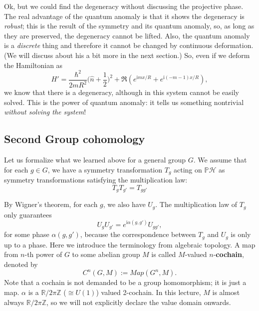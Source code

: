 \documentclass[
]{scrartcl}
\numberwithin{equation}{section}
\theoremstyle{definition}
\theoremstyle{definition}
\theoremstyle{definition}
\theoremstyle{definition}
\theoremstyle{remark}
\begin{document}
Ok, but we could find the degeneracy without discussing the projective phase. The real advantage of the quantum anomaly is that it shows the degeneracy is \emph{robust}; this is the result of the symmetry and its quantum anomaly, so, as long as they are preserved, the degeneracy cannot be lifted.
Also, the quantum anomaly is a \emph{discrete} thing and therefore it cannot be changed by continuous deformation. (We will discuss about his a bit more in the next section.)
So, even if we deform the Hamiltonian as
\begin{equation}
  \label{eq:ABringHamDef}
  H' = \frac{\hbar^2}{2mR^2}\bigl(\hat{n} + \frac{1}{2} \bigr)^2 + \Re(e^{\mathrm{i}m x/R}+e^{\mathrm{i}(-m-1)x/R}),
\end{equation}
we know that there is a degeneracy, although in this system cannot be easily solved.
This is the power of quantum anomaly: it tells us something nontrivial \emph{without solving the system}!

\hypertarget{second-group-cohomology}{%
\subsection{Second Group cohomology}\label{second-group-cohomology}}

Let us formalize what we learned above for a general group \(G\).
We assume that for each \(g\in G\), we have a symmetry transformation \(T_g\) acting on \(\mathbb{P}\mathcal{H}\) as symmetry transformations satisfying the multiplication law:
\begin{equation}
  \label{eq:Tmult}
  T_g T_{g'} = T_{gg'}
\end{equation}

By Wigner's theorem, for each \(g\), we also have \(U_g\).
The multiplication law of \(T_g\) only guarantees
\begin{equation}
  \label{eq:ProjRepGen}
  U_g U_{g'} = e^{\mathrm{i}\alpha(g,g')}U_{gg'},
\end{equation}
for some phase \(\alpha(g,g')\), because the correspondence between \(T_g\) and \(U_g\) is only up to a phase.
Here we introduce the terminology from algebraic topology.
A map from \(n\)-th power of \(G\) to some abelian group \(M\) is called \(M\)-valued \(n\)-\textbf{cochain}, denoted by
\begin{equation}
  \label{eq:GroupCochain}
  C^n(G,M) := Map(G^n,M).
\end{equation}
Note that a cochain is not demanded to be a group homomorphism; it is just a map.
\(\alpha\) is a \(\mathbb{R}/2\pi\mathbb{Z}\) (\(\cong U(1)\)) valued 2-cochain.
In this lecture, \(M\) is almost always \(\mathbb{R}/2\pi\mathbb{Z}\), so we will not explicitly declare the value domain onwards.
\end{document}
